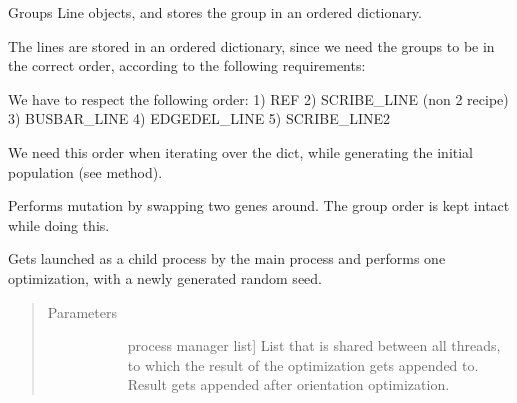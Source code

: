 \documentclass[letterpaper,10pt,english,openany,oneside]{sphinxmanual}
\begin{document}
\begin{fulllineitems}
\begin{fulllineitems}
\end{fulllineitems}


\begin{fulllineitems}
\label{\detokenize{reference:cnc.optimization.CNCOptimizer.group_lines}}
Groups Line objects, and stores the group in an ordered dictionary.

The lines are stored in an ordered dictionary, since we need the groups
to be in the correct order, according to the following requirements:

We have to respect the following order:
1) REF
2) SCRIBE\_LINE (non 2 recipe)
3) BUSBAR\_LINE
4) EDGEDEL\_LINE
5) SCRIBE\_LINE2

We need this order when iterating over the dict, while generating the
initial population (see  method).

\end{fulllineitems}


\begin{fulllineitems}
\label{\detokenize{reference:cnc.optimization.CNCOptimizer.mutation}}
Performs mutation by swapping two genes around. The group order is kept
intact while doing this.

\end{fulllineitems}


\begin{fulllineitems}
\label{\detokenize{reference:cnc.optimization.CNCOptimizer.opt_thread}}
Gets launched as a child process by the main process and performs one
optimization, with a newly generated random seed.
\begin{quote}\begin{description}
\item[{Parameters}] \leavevmode\begin{description}
\item[{}] \leavevmode{[}process manager list{]}
List that is shared between all threads, to which the result of the
optimization gets appended to. Result gets appended after
orientation optimization.


\end{description}
\end{description}
\end{quote}
\end{fulllineitems}
\end{fulllineitems}
\end{document}
